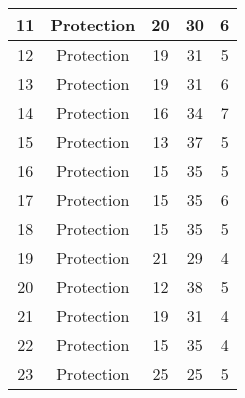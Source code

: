 \documentclass[results.tex]{subfiles}
\begin{document}
\begin{center}
\begin{tabular}{| c || c | c | c | c |}
            \hline
            11                      & Protection                   & 20                     & 30                      & 6                    \\
            \hline
            12                      & Protection                   & 19                     & 31                      & 5                    \\
            \hline
            13                      & Protection                   & 19                     & 31                      & 6                    \\
            \hline
            14                      & Protection                   & 16                     & 34                      & 7                    \\
            \hline
            15                      & Protection                   & 13                     & 37                      & 5                    \\
            \hline
            16                      & Protection                   & 15                     & 35                      & 5                    \\
            \hline
            17                      & Protection                   & 15                     & 35                      & 6                    \\
            \hline
            18                      & Protection                   & 15                     & 35                      & 5                    \\
            \hline
            19                      & Protection                   & 21                     & 29                      & 4                    \\
            \hline
            20                      & Protection                   & 12                     & 38                      & 5                    \\
            \hline
            21                      & Protection                   & 19                     & 31                      & 4                    \\
            \hline
            22                      & Protection                   & 15                     & 35                      & 4                    \\
            \hline
            23                      & Protection                   & 25                     & 25                      & 5                    \\

\end{tabular}
\end{center}
\end{document}
